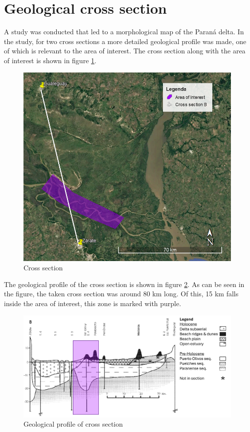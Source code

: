 \section{Geological cross section}
A study was conducted that led to a morphological map of the Paraná delta. In the study, for two cross sections a more detailed geological profile was made, one of which is relevant to the area of interest. The cross section along with the area of interest is shown in figure \ref{fig:crosssectiongeo}.

\begin{figure}[H]
    \centering
    \includegraphics[width=0.75\linewidth]{figures/ch9/CrossSectionB.png}
    \caption{Cross section}
    \label{fig:crosssectiongeo}
\end{figure}

The geological profile of the cross section is shown in figure \ref{fig:geolprofile}. As can be seen in the figure, the taken cross section was around 80 km long. Of this, 15 km falls inside the area of interest, this zone is marked with purple.

\begin{figure}[H]
    \centering
    \includegraphics[width=1\linewidth]{figures/ch9/CrossSectionBResults.png}
    \caption{Geological profile of cross section}
    \label{fig:geolprofile}
\end{figure}

